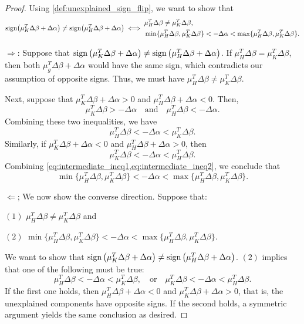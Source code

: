 \begin{proof}
Using \cref{def:unexplained_sign_flip}, we want to show that 
\[
\operatorname{sign}\!\left( \mu_K^T \Delta\beta + \Delta\alpha \right)
\neq
\operatorname{sign}\!\left( \mu_H^T \Delta\beta + \Delta\alpha \right)
\iff
\begin{aligned}
&\mu_H^T \Delta\beta \neq \mu_K^T \Delta\beta, \\
&\min\{\mu_H^T \Delta\beta, \mu_K^T \Delta\beta\}
<
-\Delta\alpha
<
\max\{\mu_H^T \Delta\beta, \mu_K^T \Delta\beta\}.
\end{aligned}
\]

$\Rightarrow$: Suppose that $\operatorname{sign}\left( \mu_K^T \Delta\beta + \Delta\alpha \right) \neq \operatorname{sign}\left( \mu_H^T \Delta\beta + \Delta\alpha \right)$. If $\mu_H^T \Delta\beta = \mu_K^T \Delta\beta$, then both $\mu_g^T \Delta\beta + \Delta\alpha$ would have the same sign, which contradicts our assumption of opposite signs. Thus, we must have $\mu_H^T \Delta\beta \neq \mu_K^T \Delta\beta$.

Next, suppose that $\mu_K^T \Delta\beta + \Delta\alpha >0$ and $\mu_H^T \Delta\beta + \Delta\alpha <0$. Then, 
\[
\mu_K^T \Delta\beta > -\Delta\alpha \quad \text{and} \quad \mu_H^T \Delta\beta < -\Delta\alpha.
\]
Combining these two inequalities, we have 
\begin{equation}
  \label{eq:intermediate_ineq1}
  \mu_H^T \Delta\beta < -\Delta\alpha < \mu_K^T \Delta\beta.
\end{equation}
Similarly, if $\mu_K^T \Delta\beta + \Delta\alpha <0$ and $\mu_H^T \Delta\beta + \Delta\alpha >0$, then
\begin{equation}
  \label{eq:intermediate_ineq2}
  \mu_K^T \Delta\beta < -\Delta\alpha < \mu_H^T \Delta\beta.
\end{equation}
Combining \cref{eq:intermediate_ineq1,eq:intermediate_ineq2}, we conclude that
\[
  \min\{\mu_H^T \Delta\beta, \mu_K^T \Delta\beta\} < -\Delta\alpha < \max\{\mu_H^T \Delta\beta, \mu_K^T \Delta\beta\}.
\]

$\Leftarrow$; We now show the converse direction. Suppose that:

$(1)$ $\mu_H^T \Delta\beta \neq \mu_K^T \Delta\beta$ and 

$(2)$ $\min\{\mu_H^T \Delta\beta, \mu_K^T \Delta\beta\} < -\Delta\alpha < \max\{\mu_H^T \Delta\beta, \mu_K^T \Delta\beta\}$. 

We want to show that $\operatorname{sign}\left( \mu_K^T \Delta\beta + \Delta\alpha \right) \neq \operatorname{sign}\left( \mu_H^T \Delta\beta + \Delta\alpha \right)$.
$(2)$ implies that one of the following must be true:
\[
  \mu_H^T \Delta\beta < -\Delta\alpha < \mu_K^T \Delta\beta, \quad \text{or} \quad \mu_K^T \Delta\beta < -\Delta\alpha < \mu_H^T \Delta\beta.
\]
If the first one holds, then $\mu_H^T \Delta\beta + \Delta\alpha <0$ and $\mu_K^T \Delta\beta + \Delta\alpha >0$, that is, the unexplained components have opposite signs. If the second holds, a symmetric argument yields the same conclusion as desired. 


\end{proof}
